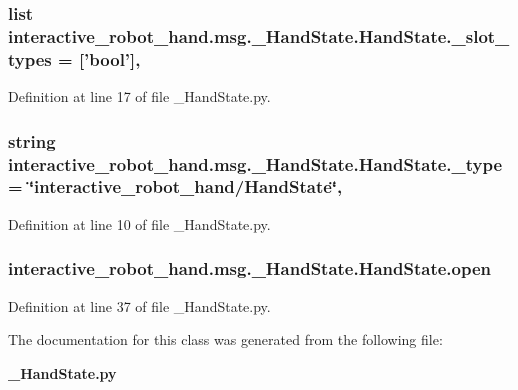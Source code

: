 \subsubsection[{\-\_\-slot\-\_\-types}]{\setlength{\rightskip}{0pt plus 5cm}list interactive\-\_\-robot\-\_\-hand.\-msg.\-\_\-\-Hand\-State.\-Hand\-State.\-\_\-slot\-\_\-types = ['bool']\hspace{0.3cm}{\ttfamily [static]}, {\ttfamily [private]}}\label{classinteractive__robot__hand_1_1msg_1_1__HandState_1_1HandState_a5caf1d34eb35cd313d2ac180f4fe259f}


Definition at line 17 of file \-\_\-\-Hand\-State.\-py.

\subsubsection[{\-\_\-type}]{\setlength{\rightskip}{0pt plus 5cm}string interactive\-\_\-robot\-\_\-hand.\-msg.\-\_\-\-Hand\-State.\-Hand\-State.\-\_\-type = \char`\"{}interactive\-\_\-robot\-\_\-hand/{\bf Hand\-State}\char`\"{}\hspace{0.3cm}{\ttfamily [static]}, {\ttfamily [private]}}\label{classinteractive__robot__hand_1_1msg_1_1__HandState_1_1HandState_a6ffeae777e3e8fbb024de185400a3148}


Definition at line 10 of file \-\_\-\-Hand\-State.\-py.

\subsubsection[{open}]{\setlength{\rightskip}{0pt plus 5cm}interactive\-\_\-robot\-\_\-hand.\-msg.\-\_\-\-Hand\-State.\-Hand\-State.\-open}\label{classinteractive__robot__hand_1_1msg_1_1__HandState_1_1HandState_a238efa58d9eb6549b9da7fe31eab9fd0}


Definition at line 37 of file \-\_\-\-Hand\-State.\-py.



The documentation for this class was generated from the following file\-:\begin{DoxyCompactItemize}
\item 
{\bf \-\_\-\-Hand\-State.\-py}\end{DoxyCompactItemize}
